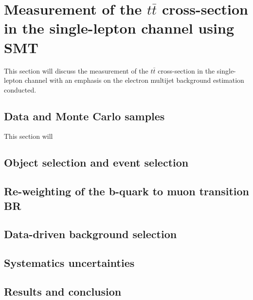 \chapter{Measurement of the $t\bar{t}$ cross-section in the single-lepton channel using SMT} \label{sec:cross_section}
This section will discuss the measurement of the $t\bar{t}$ cross-section in the single-lepton 
channel with an emphasis on the electron multijet background estimation conducted.
\section{Data and Monte Carlo samples} \label{sec:data_and_monte_carlo_samples}
This section will 
\section{Object selection and event selection} \label{sec:xsection_event_selection}
\section{Re-weighting of the b-quark to muon transition BR} \label{sec:b_mu}
\section{Data-driven background selection} \label{sec:data_driven_background_selection}
\section{Systematics uncertainties} \label{sec:systematics_uncertainties}
\section{Results and conclusion} \label{sec:results_and_conclusion}